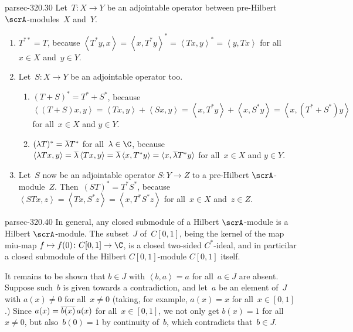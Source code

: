 \documentclass[b5page]{book}
\begin{document}
\begin{solution}{parsec-320.30}%
Let~$T\colon X\to Y$ be an adjointable operator
between pre-Hilbert $\scrA$-modules~$X$ and~$Y$.
\begin{enumerate}
\item
$T^{**}=T$,
because 
$\left<T^*y,x\right>
= \left<x,T^*y\right>^* 
= \left<Tx,y\right>^*
= \left<y,Tx\right>$
for all~$x\in X$ and~$y\in Y$.
\item
Let~$S\colon X\to Y$ be an adjointable operator too.
\begin{enumerate}
\item
$(T+S)^*=T^*+S^*$,
because $\left<(T+S)x,y\right>
= \left<Tx,y\right>+\left<Sx,y\right>
= \left<x,T^*y\right>+\left<x,S^*y\right>
= \left<x,(T^*+S^*)y\right>$
for all~$x\in X$ and $y\in Y$.
\item
$(\lambda T)^* = \smash{\overline{\lambda}}T^*$
for all~$\lambda\in \C$,
because $\left<\lambda Tx,y\right>
= \smash{\overline{\lambda}}\left<Tx,y\right>
= \smash{\overline{\lambda}}\left<x,T^*y\right>
= \left<x,\smash{\overline{\lambda}}T^*y\right>$
for all~$x\in X$ and $y\in Y$.
\end{enumerate}

\item
Let~$S$ now be an adjointable operator
$S\colon Y\to Z$
to a pre-Hilbert $\scrA$-module~$Z$.
Then~$(ST)^*=T^*S^*$,
because
$\left<STx,z\right>
= \left<Tx,S^*z\right>
= \left<x,T^*S^*z\right>$
for all~$x\in X$ and~$z\in Z$.
\end{enumerate}
\end{solution}
\begin{solution}{parsec-320.40}%
In general,
any closed submodule of a Hilbert $\scrA$-module
is a Hilbert $\scrA$-module.
The subset~$J$ of~$C[0,1]$,
being the kernel of the map miu-map $f\mapsto f(0)\colon C[0,1]\to\C$,
is a closed two-sided $C^*$-ideal,
and in particilar a closed submodule of
the Hilbert $C[0,1]$-module $C[0,1]$ itself.

It remains to be shown that $b\in J$ 
with $\left<b,a\right>=a$ for all~$a\in J$ are absent.
Suppose such~$b$ is given towards a contradiction,
and let~$a$ be an element of~$J$
with $a(x)\neq 0$ for all~$x\neq 0$
(taking, for example, $a(x)=x$ for all~$x\in [0,1]$.)
Since $a(x)= \smash{\overline{b(x)}}\,a(x)$
for all~$x\in [0,1]$,
we not only get $b(x)=1$
for all~$x\neq 0$,
but also~$b(0)=1$ by continuity of~$b$,
which contradicts that~$b\in J$.
\end{solution}
\end{document}
